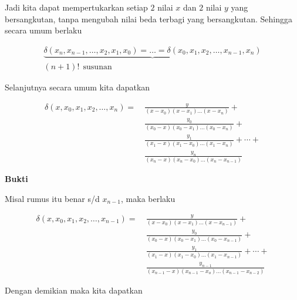 Jadi kita dapat mempertukarkan setiap $2$ nilai $x$ dan $2$ nilai $y$ yang bersangkutan, tanpa mengubah nilai beda terbagi yang bersangkutan. Sehingga secara umum berlaku

\begin{gather*}
\underbrace{\delta(x_n,x_{n-1},\ldots, x_2, x_1, x_0) = \ldots = \delta(x_0,x_1,x_2,\ldots,x_{n-1},x_n)} \\
(n+1)! ~~\text{susunan}
\end{gather*}

Selanjutnya secara umum kita dapatkan

\begin{equation}
\boxed{
\begin{split}
\delta(x,x_0,x_1,x_2,\ldots,x_n) =~& \frac{y}{(x-x_0)(x-x_1)\ldots(x-x_n)} + \\
&\frac{y_0}{(x_0-x)(x_0-x_1)\ldots(x_0-x_n)} +\\
&\frac{y_1}{(x_1-x)(x_1-x_0)\ldots(x_1-x_n)}+\cdots+\\
&\frac{y_n}{(x_n-x)(x_n-x_0)\ldots(x_n-x_{n-1})}
\end{split}
}
\end{equation}

\textbf{Bukti}

Misal rumus itu benar s/d $x_{n-1}$, maka berlaku

\begin{equation*}
\begin{split}
\delta(x,x_0,x_1,x_2,\ldots,x_{n-1}) =~& \frac{y}{(x-x_0)(x-x_1)\ldots(x-x_{n-1})} +\\
& \frac{y_0}{(x_0-x)(x_0-x_1)\ldots(x_0-x_{n-1})} +\\
& \frac{y_1}{(x_1-x)(x_1-x_0)\ldots(x_1-x_{n-1})} + \cdots +\\
& \frac{y_{n-1}}{(x_{n-1}-x)(x_{n-1}-x_o)\ldots(x_{n-1}-x_{n-2})}
\end{split}
\end{equation*}

Dengan demikian maka kita dapatkan

